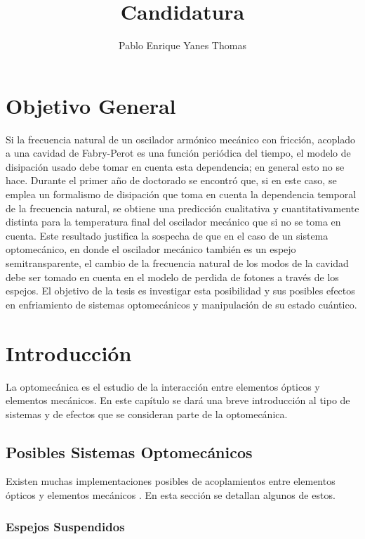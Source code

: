 \documentclass[10pt,a4paper]{report}
\author{Pablo Enrique Yanes Thomas}
\title{Candidatura}
\begin{document}
\tableofcontents
\chapter*{Objetivo General}
Si la frecuencia natural de un oscilador armónico mecánico con fricción,
acoplado a una cavidad de Fabry-Perot es una función periódica del
tiempo, el modelo de disipación usado debe tomar en cuenta esta dependencia; en
general esto no se hace. Durante el primer año de doctorado se encontró
que, si en este caso, se emplea un formalismo de disipación que toma en
cuenta la dependencia temporal de la frecuencia natural, se obtiene una
predicción cualitativa y cuantitativamente distinta para la temperatura
final del oscilador mecánico que si no se  toma en cuenta. Este
resultado justifica la sospecha de que en el caso de un sistema
optomecánico, en donde el oscilador mecánico también es un espejo
semitransparente, el cambio de la frecuencia natural de los modos de la
cavidad debe ser tomado en cuenta en el modelo de perdida de
fotones a través de los espejos. El objetivo de la tesis es investigar
esta posibilidad y sus posibles efectos en enfriamiento de sistemas
optomecánicos y manipulación de su estado cuántico.


\chapter{Introducción}

La optomecánica es el estudio de la interacción entre elementos ópticos y elementos mecánicos. En este capítulo se dará una breve introducción al tipo de sistemas y de efectos que se consideran parte de la optomecánica. 


\section{Posibles Sistemas Optomecánicos}

Existen muchas implementaciones posibles de acoplamientos entre elementos ópticos y elementos mecánicos \cite{KippenberCO}. En esta sección se detallan algunos de estos.

\subsection{Espejos Suspendidos}
\end{document}
